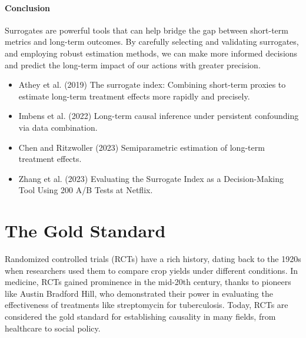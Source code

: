 \documentclass[
  letterpaper,
  DIV=11,
  numbers=noendperiod]{scrreprt}
\providecommand{\tightlist}{%
  \setlength{\itemsep}{0pt}\setlength{\parskip}{0pt}}\usepackage{longtable,booktabs,array}
\begin{document}
\subsection{Conclusion}\label{conclusion-2}

Surrogates are powerful tools that can help bridge the gap between
short-term metrics and long-term outcomes. By carefully selecting and
validating surrogates, and employing robust estimation methods, we can
make more informed decisions and predict the long-term impact of our
actions with greater precision.

\begin{tcolorbox}[enhanced jigsaw, colframe=quarto-callout-tip-color-frame, left=2mm, toprule=.15mm, colbacktitle=quarto-callout-tip-color!10!white, title=\textcolor{quarto-callout-tip-color}{\faLightbulb}\hspace{0.5em}{Learn more}, coltitle=black, rightrule=.15mm, leftrule=.75mm, colback=white, arc=.35mm, bottomtitle=1mm, bottomrule=.15mm, breakable, titlerule=0mm, opacitybacktitle=0.6, toptitle=1mm, opacityback=0]

\begin{itemize}
\tightlist
\item
  Athey et al. (2019) The surrogate index: Combining short-term proxies
  to estimate long-term treatment effects more rapidly and precisely.
\item
  Imbens et al. (2022) Long-term causal inference under persistent
  confounding via data combination.
\item
  Chen and Ritzwoller (2023) Semiparametric estimation of long-term
  treatment effects.
\item
  Zhang et al. (2023) Evaluating the Surrogate Index as a
  Decision-Making Tool Using 200 A/B Tests at Netflix.
\end{itemize}

\end{tcolorbox}

\part{The Gold Standard}

Randomized controlled trials (RCTs) have a rich history, dating back to
the 1920s when researchers used them to compare crop yields under
different conditions. In medicine, RCTs gained prominence in the
mid-20th century, thanks to pioneers like Austin Bradford Hill, who
demonstrated their power in evaluating the effectiveness of treatments
like streptomycin for tuberculosis. Today, RCTs are considered the gold
standard for establishing causality in many fields, from healthcare to
social policy.
\end{document}
